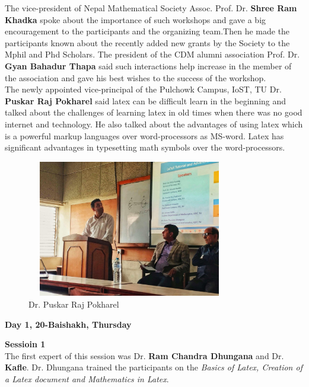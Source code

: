 \documentclass[a4paper,12pt]{report}
\begin{document}
\noindent
The vice-president of Nepal Mathematical Society Assoc. Prof. Dr. \textbf{Shree Ram Khadka} spoke about the importance of such workshops and gave a big encouragement to the participants and the organizing team.Then he made the participants known about the recently added new grants by the Society to the Mphil and Phd Scholars. The president of the CDM alumni association Prof. Dr. \textbf{Gyan Bahadur Thapa} said such interactions help increase in the member of the association and gave his best wishes to the success of the workshop.\\[3mm]

The newly appointed vice-principal of the Pulchowk Campus, IoST, TU Dr.\textbf{ Puskar Raj Pokharel} said latex can be difficult learn in the beginning and talked about the challenges of learning latex in old times when there was no good internet and technology. He also talked about the advantages of using latex which is a powerful markup languages over word-processors as MS-word. Latex has significant advantages in typesetting math symbols over the word-processors.

\begin{figure}[h!]
  \centering
  \includegraphics[height=6cm, width=9cm]{puskarsir2.jpg}
  \caption{Dr. Puskar Raj Pokharel}
\end{figure}
\clearpage

\begin{center}
  {\bfseries \Large Day 1, 20-Baishakh, Thursday}
\end{center}
\vspace{3mm}

{\bfseries \large Sessioin 1}\\[3mm]
The first expert of this session was Dr. \textbf{Ram Chandra Dhungana} and Dr. \textbf{Kafle}. Dr. Dhungana trained the participants on the \textit{Basics of Latex, Creation of a Latex document and Mathematics in Latex}.
\vspace{3mm}
\end{document}
